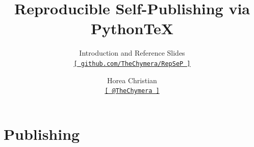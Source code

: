 
\title[Reproducible Self-Publishing via Python\TeX\ --- Introduction and Reference Slides]{Reproducible Self-Publishing via Python\TeX}
\subtitle{Introduction and Reference Slides\\\href{https://github.com/TheChymera/RepSeP}{\small\texttt{[ github.com/TheChymera/RepSeP ]}}}
\author[Horea Christian]{Horea Christian\\\href{https://twitter.com/TheChymera}{\small\texttt{[ @TheChymera ]}}}

	\begin{frame}
		\titlepage
	\end{frame}
	\section{Publishing}
